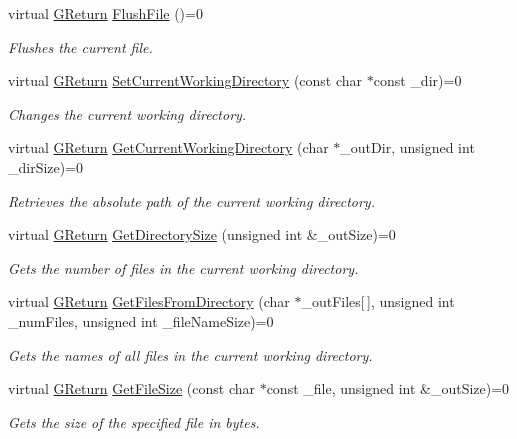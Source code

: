 \begin{DoxyCompactItemize}
virtual \mbox{\hyperlink{namespaceGW_a67a839e3df7ea8a5c5686613a7a3de21}{G\+Return}} \mbox{\hyperlink{classGW_1_1SYSTEM_1_1GFile_ae3105b637ef87af268722a696b8657a9}{Flush\+File}} ()=0
\begin{DoxyCompactList}\small\item\em Flushes the current file. \end{DoxyCompactList}\item 
virtual \mbox{\hyperlink{namespaceGW_a67a839e3df7ea8a5c5686613a7a3de21}{G\+Return}} \mbox{\hyperlink{classGW_1_1SYSTEM_1_1GFile_ab28d2e7ecf3ac893df88603e5448561a}{Set\+Current\+Working\+Directory}} (const char $\ast$const \+\_\+dir)=0
\begin{DoxyCompactList}\small\item\em Changes the current working directory. \end{DoxyCompactList}\item 
virtual \mbox{\hyperlink{namespaceGW_a67a839e3df7ea8a5c5686613a7a3de21}{G\+Return}} \mbox{\hyperlink{classGW_1_1SYSTEM_1_1GFile_a6853b717e838d1b3a54f22449a37d764}{Get\+Current\+Working\+Directory}} (char $\ast$\+\_\+out\+Dir, unsigned int \+\_\+dir\+Size)=0
\begin{DoxyCompactList}\small\item\em Retrieves the absolute path of the current working directory. \end{DoxyCompactList}\item 
virtual \mbox{\hyperlink{namespaceGW_a67a839e3df7ea8a5c5686613a7a3de21}{G\+Return}} \mbox{\hyperlink{classGW_1_1SYSTEM_1_1GFile_ac2de86bf6cf61455577efc47277ecb94}{Get\+Directory\+Size}} (unsigned int \&\+\_\+out\+Size)=0
\begin{DoxyCompactList}\small\item\em Gets the number of files in the current working directory. \end{DoxyCompactList}\item 
virtual \mbox{\hyperlink{namespaceGW_a67a839e3df7ea8a5c5686613a7a3de21}{G\+Return}} \mbox{\hyperlink{classGW_1_1SYSTEM_1_1GFile_ae062d19f84d120adea94756d1d26e41e}{Get\+Files\+From\+Directory}} (char $\ast$\+\_\+out\+Files\mbox{[}$\,$\mbox{]}, unsigned int \+\_\+num\+Files, unsigned int \+\_\+file\+Name\+Size)=0
\begin{DoxyCompactList}\small\item\em Gets the names of all files in the current working directory. \end{DoxyCompactList}\item 
virtual \mbox{\hyperlink{namespaceGW_a67a839e3df7ea8a5c5686613a7a3de21}{G\+Return}} \mbox{\hyperlink{classGW_1_1SYSTEM_1_1GFile_a2f4cba2dad96fa4c894545f43fee64b5}{Get\+File\+Size}} (const char $\ast$const \+\_\+file, unsigned int \&\+\_\+out\+Size)=0
\begin{DoxyCompactList}\small\item\em Gets the size of the specified file in bytes. \end{DoxyCompactList}\end{DoxyCompactItemize}


